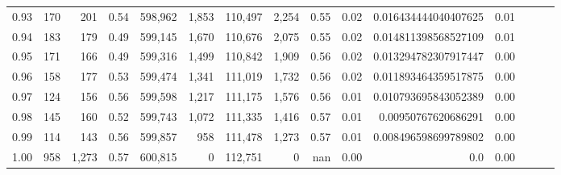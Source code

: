 \begin{tabular}{rrrrrrrrrrrrrrr}
0.93 &     170 &    201 &  0.54 &  598,962 &    1,853 &  110,497 &    2,254 &  0.55 &  0.02 &  0.016434444040407625 &      0.01 \\
0.94 &     183 &    179 &  0.49 &  599,145 &    1,670 &  110,676 &    2,075 &  0.55 &  0.02 &  0.014811398568527109 &      0.01 \\
0.95 &     171 &    166 &  0.49 &  599,316 &    1,499 &  110,842 &    1,909 &  0.56 &  0.02 &  0.013294782307917447 &      0.00 \\
0.96 &     158 &    177 &  0.53 &  599,474 &    1,341 &  111,019 &    1,732 &  0.56 &  0.02 &  0.011893464359517875 &      0.00 \\
0.97 &     124 &    156 &  0.56 &  599,598 &    1,217 &  111,175 &    1,576 &  0.56 &  0.01 &  0.010793695843052389 &      0.00 \\
0.98 &     145 &    160 &  0.52 &  599,743 &    1,072 &  111,335 &    1,416 &  0.57 &  0.01 &   0.00950767620686291 &      0.00 \\
0.99 &     114 &    143 &  0.56 &  599,857 &      958 &  111,478 &    1,273 &  0.57 &  0.01 &  0.008496598699789802 &      0.00 \\
1.00 &     958 &  1,273 &  0.57 &  600,815 &        0 &  112,751 &        0 &   nan &  0.00 &                   0.0 &      0.00 \\
\bottomrule
\end{tabular}
